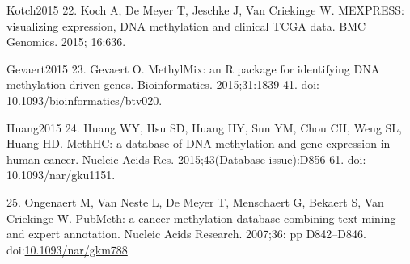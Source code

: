 \documentclass[10pt,letterpaper]{article}
\begin{document}
\leavevmode\hypertarget{ref-}{Kotch2015}%
22. 	Koch A, De Meyer T, Jeschke J, Van Criekinge W. MEXPRESS: visualizing 
expression, DNA methylation and clinical TCGA data. BMC Genomics. 2015; 16:636.

\leavevmode\hypertarget{ref-}{Gevaert2015}%
23. Gevaert O. MethylMix: an R package for identifying DNA methylation-driven 
genes. Bioinformatics. 2015;31:1839-41. 
doi: 10.1093/bioinformatics/btv020. 

\leavevmode\hypertarget{ref-}{Huang2015}%
24. Huang WY, Hsu SD, Huang HY, Sun YM, Chou CH, Weng SL, Huang HD. MethHC: a 
database of DNA methylation and gene expression in human cancer. Nucleic Acids 
Res. 2015;43(Database issue):D856-61. doi: 10.1093/nar/gku1151.

\leavevmode\hypertarget{ref-Ongenaert2007}{}%
25. Ongenaert M, Van Neste L, De Meyer T, Menschaert G, Bekaert S, Van
Criekinge W. PubMeth: a cancer methylation database combining
text-mining and expert annotation. Nucleic Acids Research. 2007;36:
pp D842--D846.
doi:\href{https://doi.org/10.1093/nar/gkm788}{10.1093/nar/gkm788}

\nolinenumbers
\end{document}

